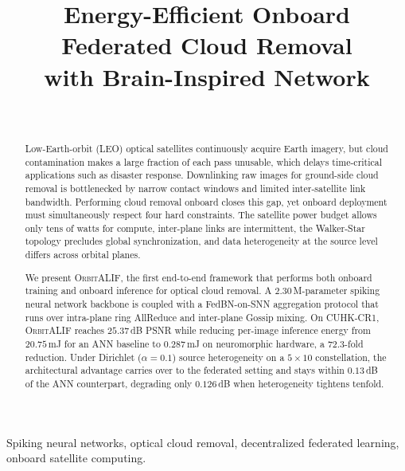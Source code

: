 \documentclass[conference]{IEEEtran}
\newcommand{\OrbitALIF}{\textsc{OrbitALIF}}
\begin{document}
\title{Energy-Efficient Onboard Federated Cloud Removal\\
       with Brain-Inspired Network}

\author{
  \\
}

\maketitle

\begin{abstract}
Low-Earth-orbit (LEO) optical satellites continuously acquire Earth
imagery, but cloud contamination makes a large fraction of each pass
unusable, which delays time-critical applications such as disaster
response. Downlinking raw images for ground-side cloud removal is
bottlenecked by narrow contact windows and limited inter-satellite
link bandwidth. Performing cloud removal onboard closes this gap, yet
onboard deployment must simultaneously respect four hard constraints.
The satellite power budget allows only tens of watts for compute,
inter-plane links are intermittent, the Walker-Star topology
precludes global synchronization, and data heterogeneity at the
source level differs across orbital planes.

We present \OrbitALIF{}, the first end-to-end framework that performs
both onboard training and onboard inference for optical cloud removal.
A $2.30$\,M-parameter spiking neural network backbone is coupled with
a FedBN-on-SNN aggregation protocol that runs over intra-plane ring
AllReduce and inter-plane Gossip mixing. On CUHK-CR1, \OrbitALIF{}
reaches $25.37$\,dB PSNR while reducing per-image inference energy
from $20.75$\,mJ for an ANN baseline to $0.287$\,mJ on neuromorphic
hardware, a $72.3$-fold reduction. Under Dirichlet ($\alpha\!=\!0.1$)
source heterogeneity on a $5\!\times\!10$ constellation, the
architectural advantage carries over to the federated setting and
stays within $0.13$\,dB of the ANN counterpart, degrading only
$0.126$\,dB when heterogeneity tightens tenfold.
\end{abstract}

\begin{IEEEkeywords}
Spiking neural networks, optical cloud removal, decentralized
federated learning, onboard satellite computing.
\end{IEEEkeywords}
\end{document}
